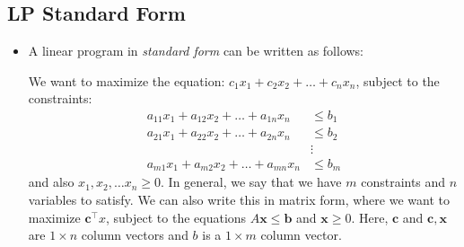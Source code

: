 \subsection{LP Standard Form}
\begin{itemize}
	\item A linear program in \textit{standard form} can be written as follows:

		We want to maximize the equation: \( c_1x_1 + c_2x_2 + \dots + c_n x_n \), subject to the constraints:
		\begin{align*}
			a_{11}x_1 + a_{12}x_2 + \dots + a_{1n}x_n &\le b_1\\
			a_{21}x_1 + a_{22}x_2 + \dots + a_{2n}x_n &\le b_2\\
													  & \vdots\\
			a_{m 1} x_1 + a_{m 2} x_2 + \dots + a_{mn}x_n &\le b_m
		\end{align*}
		and also $x_1, x_2, \dots x_n \ge 0$. In general, we say that we have $m$ constraints and $n$ variables 
		to satisfy. We can also write this in matrix form, where we want to maximize $\mathbf c^\top x$, 
		subject to the equations $A\mathbf x \le \mathbf b$ and $\mathbf x \ge 0$. Here, $\mathbf c$ and
		\( \mathbf c, \mathbf x \) are $1 \times n$ column vectors and $b$ is a $1 \times m$ column vector.

\end{itemize}
